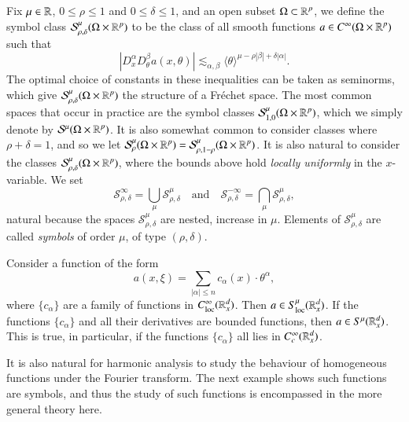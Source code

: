 Fix $\mu \in \operatorname{\mathbb{R}}$, $0 \leq \rho \leq 1$ and $0 \leq \delta \leq 1$, and an open subset $\Omega \subset \operatorname{\mathbb{R}}^p$, we define the symbol class $\mathcal{S}^\mu_{\rho,\delta}(\Omega \times \operatorname{\mathbb{R}}^p)$ to be the class of all smooth functions $a \in C^\infty(\Omega \times \operatorname{\mathbb{R}}^p)$ such that
%
\[ |D^\alpha_x D^\beta_\theta a(x,\theta)| \lesssim_{\alpha,\beta} \langle \theta \rangle^{\mu - \rho |\beta| + \delta |\alpha|}. \]
%
The optimal choice of constants in these inequalities can be taken as seminorms, which give $\mathcal{S}^\mu_{\rho,\delta}(\Omega \times \operatorname{\mathbb{R}}^p)$ the structure of a Fr\'{e}chet space. The most common spaces that occur in practice are the symbol classes $\mathcal{S}^\mu_{1,0}(\Omega \times \operatorname{\mathbb{R}}^p)$, which we simply denote by $\mathcal{S}^\mu(\Omega \times \operatorname{\mathbb{R}}^p)$. It is also somewhat common to consider classes where $\rho + \delta = 1$, and so we let $\mathcal{S}^\mu_\rho(\Omega \times \operatorname{\mathbb{R}}^p) = \mathcal{S}^\mu_{\rho,1-\rho}(\Omega \times \operatorname{\mathbb{R}}^p)$. It is also natural to consider the classes $\mathcal{S}^\mu_{\rho,\delta}(\Omega \times \operatorname{\mathbb{R}}^p)$, where the bounds above hold \emph{locally uniformly} in the $x$-variable. We set
%
\[ \mathcal{S}^\infty_{\rho,\delta} = \bigcup_\mu \mathcal{S}^\mu_{\rho,\delta} \quad\text{and}\quad \mathcal{S}^{-\infty}_{\rho,\delta} = \bigcap_\mu \mathcal{S}^\mu_{\rho,\delta}, \]
%
natural because the spaces $\mathcal{S}^\mu_{\rho,\delta}$ are nested, increase in $\mu$. Elements of $\mathcal{S}^\mu_{\rho,\delta}$ are called \emph{symbols} of order $\mu$, of type $(\rho,\delta)$.

\begin{example}
    Consider a function of the form
    \[ a(x,\xi) = \sum_{|\alpha| \leq n} c_\alpha(x) \cdot \theta^\alpha, \]
    where $\{ c_\alpha \}$ are a family of functions in $C^\infty_{\text{loc}}(\operatorname{\mathbb{R}}^d_x)$. Then $a \in S^\mu_{\text{loc}}(\operatorname{\mathbb{R}}^d_x)$. If the functions $\{ c_\alpha \}$ and all their derivatives are bounded functions, then $a \in S^\mu(\operatorname{\mathbb{R}}^d_x)$. This is true, in particular, if the functions $\{ c_\alpha \}$ all lies in $C_c^\infty(\operatorname{\mathbb{R}}^d_x)$.
\end{example}

It is also natural for harmonic analysis to study the behaviour of homogeneous functions under the Fourier transform. The next example shows such functions are symbols, and thus the study of such functions is encompassed in the more general theory here.

